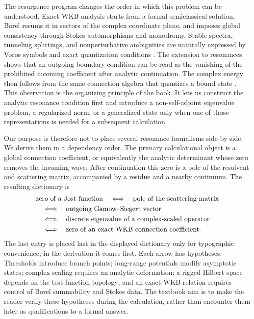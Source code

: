 The resurgence program changes the order in which this problem can be
understood.  Exact WKB analysis starts from a formal semiclassical solution,
Borel resums it in sectors of the complex coordinate plane, and imposes global
consistency through Stokes automorphisms and monodromy.  Stable spectra,
tunneling splittings, and nonperturbative ambiguities are naturally expressed
by Voros symbols and exact quantization conditions
\cite{Voros:1983xx,Delabaere:1999xx,Iwaki:2014vad}.
The extension to resonances shows that an outgoing boundary condition can be
read as the vanishing of the prohibited incoming coefficient after analytic
continuation.  The complex energy then follows from the same connection
algebra that quantizes a bound state
\cite{Morikawa:2025grx,Morikawa:2025xjq,Morikawa:2025vvs}.
This observation is the organizing principle of the book.  It lets
us construct the analytic resonance condition first and introduce a
non-self-adjoint eigenvalue problem, a regularized norm, or a generalized
state only when one of those representations is needed for a subsequent
calculation.

Our purpose is therefore not to place several resonance formalisms side by
side.  We derive them in a dependency order.  The
primary calculational object is a global connection coefficient, or
equivalently the analytic determinant whose zero removes the incoming wave.
After continuation this zero is a pole of the resolvent and scattering
matrix, accompanied by a residue and a nearby continuum.  The resulting
dictionary is
\begin{align}
  &\text{zero of a Jost function}
  \quad\Longleftrightarrow\quad
  \text{pole of the scattering matrix}
  \notag\\
  &\quad\Longleftrightarrow\quad
  \text{outgoing Gamow--Siegert vector}
  \notag\\
  &\quad\Longleftrightarrow\quad
  \text{discrete eigenvalue of a complex-scaled operator}
  \notag\\
  &\quad\Longleftrightarrow\quad
  \text{zero of an exact-WKB connection coefficient} .
  \label{eq:intro-dictionary}
\end{align}
The last entry is placed last in the displayed dictionary only for typographic
convenience; in the derivation it comes first.  Each arrow has hypotheses.
Thresholds introduce branch points; long-range
potentials modify asymptotic states; complex scaling requires an analytic
deformation; a rigged Hilbert space depends on the test-function topology; and
an exact-WKB relation requires control of Borel summability and Stokes data.
The textbook aim is to make the reader verify these hypotheses during the
calculation, rather than encounter them later as qualifications to a formal
answer.

